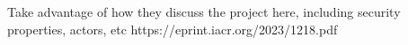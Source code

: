 Take advantage of how they discuss the project here, including security properties, actors, etc
https://eprint.iacr.org/2023/1218.pdf